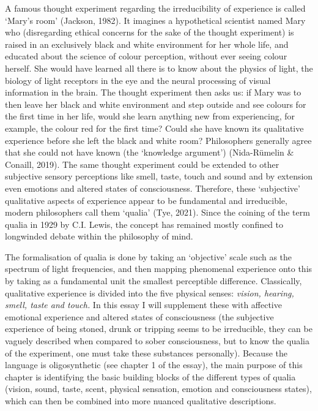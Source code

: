 A famous thought experiment regarding the irreducibility of experience is called ‘Mary’s room’ (Jackson, 1982). It imagines a hypothetical scientist named Mary who (disregarding ethical concerns for the sake of the thought experiment) is raised in an exclusively black and white environment for her whole life, and educated about the science of colour perception, without ever seeing colour herself. She would have learned all there is to know about the physics of light, the biology of light receptors in the eye and the neural processing of visual information in the brain. The thought experiment then asks us: if Mary was to then leave her black and white environment and step outside and see colours for the first time in her life, would she learn anything new from experiencing, for example, the colour red for the first time? Could she have known its qualitative experience before she left the black and white room? Philosophers generally agree that she could not have known (the ‘knowledge argument’) (Nida-Rümelin \& Conaill, 2019). The same thought experiment could be extended to other subjective sensory perceptions like smell, taste, touch and sound and by extension even emotions and altered states of consciousness. Therefore, these ‘subjective’ qualitative aspects of experience appear to be fundamental and irreducible, modern philosophers call them ‘qualia’ (Tye, 2021). Since the coining of the term qualia in 1929 by C.I. Lewis, the concept has remained mostly confined to longwinded debate within the philosophy of mind.  

The formalisation of qualia is done by taking an ‘objective’ scale such as the spectrum of light frequencies, and then mapping phenomenal experience onto this by taking as a fundamental unit the smallest perceptible difference. Classically, qualitative experience is divided into the five physical senses: \textit{vision, hearing, smell, taste and touch.} In this essay I will supplement these with affective emotional experience and altered states of consciousness (the subjective experience of being stoned, drunk or tripping seems to be irreducible, they can be vaguely described when compared to sober consciousness, but to know the qualia of the experiment, one must take these substances personally). Because the language is oligosynthetic (see chapter 1 of the essay), the main purpose of this chapter is identifying the basic building blocks of the different types of qualia (vision, sound, taste, scent, physical sensation, emotion and consciousness states), which can then be combined into more nuanced qualitative descriptions.

